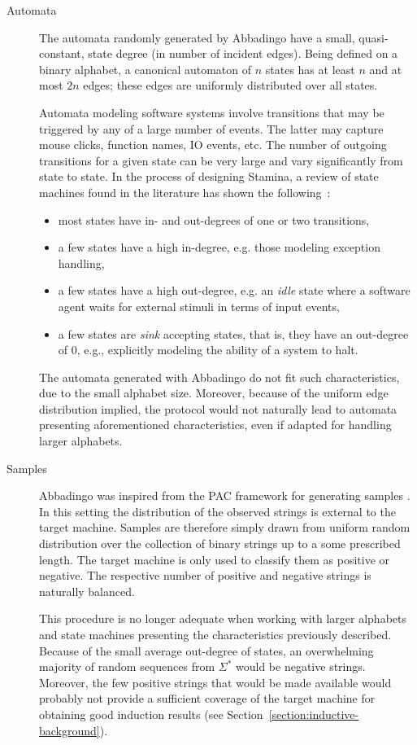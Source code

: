 \begin{description}
\item[Automata] The automata randomly generated by Abbadingo have a small, quasi-constant, state degree (in number of incident edges). Being defined on a binary alphabet, a canonical automaton of $n$ states has at least $n$ and at most $2n$ edges; these edges are uniformly distributed over all states. 

Automata modeling software systems involve transitions that may be triggered by any of a large number of events. The latter may capture mouse clicks, function names, IO events, etc. The number of outgoing transitions for a given state can be very large and vary significantly from state to state. In the process of designing Stamina, a review of state machines found in the literature has shown the following~\cite{Walkinshaw:2008}: 
\begin{itemize}
\item most states have in- and out-degrees of one or two transitions,
\item a few states have a high in-degree, e.g. those modeling exception handling,
\item a few states have a high out-degree, e.g. an \emph{idle} state where a software agent waits for external stimuli in terms of input events,
\item a few states are \emph{sink} accepting states, that is, they have an out-degree of 0, e.g., explicitly modeling the ability of a system to halt.
\end{itemize}

The automata generated with Abbadingo do not fit such characteristics, due to the small alphabet size. Moreover, because of the uniform edge distribution implied, the protocol would not naturally lead to automata presenting aforementioned characteristics, even if adapted for handling larger alphabets.

\item[Samples] Abbadingo was inspired from the PAC framework for generating samples \cite{Valiant:1984}. In this setting the distribution of the observed strings is external to the target machine. Samples are therefore simply drawn from uniform random distribution over the collection of binary strings up to a some prescribed length. The target machine is only used to classify them as positive or negative. The respective number of positive and negative strings is naturally balanced.

This procedure is no longer adequate when working with larger alphabets and state machines presenting the characteristics previously described. Because of the small average out-degree of states, an overwhelming majority of random sequences from $\Sigma^*$ would be negative strings. Moreover, the few positive strings that would be made available would probably not provide a sufficient coverage of the target machine for obtaining good induction results (see Section~\ref{section:inductive-background}).


\end{description}
